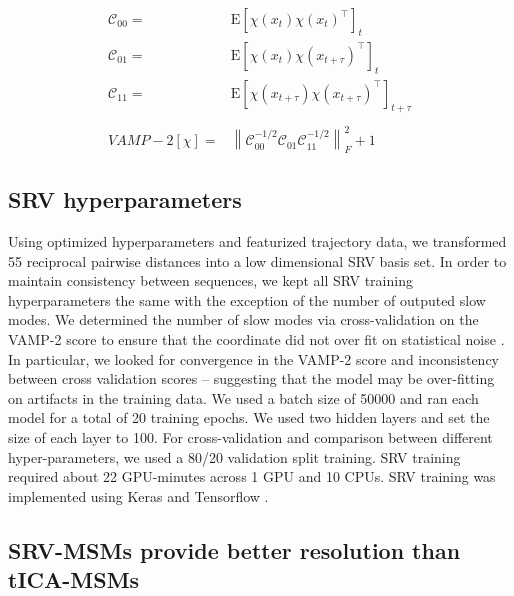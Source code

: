 \documentclass[journal=jpcbfk,manuscript=article]{achemso}
\newcommand{\Expect}[1]{\mathrm{E}\left[#1\right]}
\newcommand{\norm}[1]{\left\lVert#1\right\rVert}
\begin{document}
\begin{align*}
 	\mathscr{C}_{00}=&\Expect{\chi(x_t)\chi(x_t)^\intercal}_t\\
 	\mathscr{C}_{01}=&\Expect{\chi(x_t)\chi(x_{t+\tau})^\intercal}_t\\
 	\mathscr{C}_{11}=&\Expect{\chi(x_{t+\tau})\chi(x_{t+\tau})^\intercal}_{t+\tau}\\
	\\
 	VAMP-2[\chi]=&\norm{\mathscr{C}_{00}^{-1/2}\mathscr{C}_{01}\mathscr{C}_{11}^{-1/2}}_F^2 +1
\end{align*}\label{CK1}

\subsection{SRV hyperparameters}

Using optimized hyperparameters and featurized trajectory data, we transformed 55 reciprocal pairwise distances into a low dimensional SRV basis set. In order to maintain consistency between sequences, we kept all SRV training hyperparameters the same with the exception of the number of outputed slow modes. We determined the number of slow modes via cross-validation on the VAMP-2 score to ensure that the coordinate did not over fit on statistical noise \citep{McGibbon2015VariationalKinetics}. In particular, we looked for convergence in the VAMP-2 score and inconsistency between cross validation scores -- suggesting that the model may be over-fitting on artifacts in the training data. We used a batch size of 50000 and ran each model for a total of 20 training epochs. We used two hidden layers and set the size of each layer to 100. For cross-validation and comparison between different hyper-parameters, we used a 80/20 validation split training. SRV training required about 22 GPU-minutes across 1 GPU and 10 CPUs. SRV training was implemented using Keras and Tensorflow \citep{KerasGithub.Com, Abadi2016TensorFlow:Systems}.

\subsection{SRV-MSMs provide better resolution than tICA-MSMs} 
\end{document}

